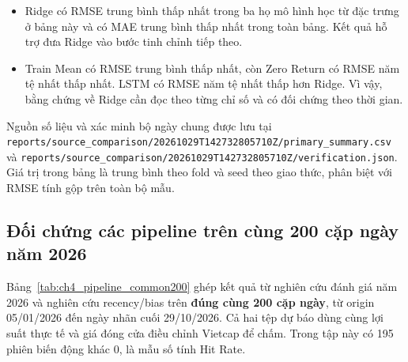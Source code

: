 \documentclass[12pt,a4paper]{report}
\begin{document}
\begin{itemize}
    \item Ridge có RMSE trung bình thấp nhất trong ba họ mô hình học từ đặc trưng ở bảng này và có MAE trung bình thấp nhất trong toàn bảng. Kết quả hỗ trợ đưa Ridge vào bước tinh chỉnh tiếp theo.
    \item Train Mean có RMSE trung bình thấp nhất, còn Zero Return có RMSE năm tệ nhất thấp nhất. LSTM có RMSE năm tệ nhất thấp hơn Ridge. Vì vậy, bằng chứng về Ridge cần đọc theo từng chỉ số và có đối chứng theo thời gian.
\end{itemize}

{\footnotesize Nguồn số liệu và xác minh bộ ngày chung được lưu tại \nolinkurl{reports/source_comparison/20261029T142732805710Z/primary_summary.csv} và \nolinkurl{reports/source_comparison/20261029T142732805710Z/verification.json}. Giá trị trong bảng là trung bình theo fold và seed theo giao thức, phân biệt với RMSE tính gộp trên toàn bộ mẫu.}

\subsection{Đối chứng các pipeline trên cùng 200 cặp ngày năm 2026}

Bảng~\ref{tab:ch4_pipeline_common200} ghép kết quả từ nghiên cứu đánh giá năm 2026 và nghiên cứu recency/bias trên \textbf{đúng cùng 200 cặp ngày}, từ origin 05/01/2026 đến ngày nhãn cuối 29/10/2026. Cả hai tệp dự báo dùng cùng lợi suất thực tế và giá đóng cửa điều chỉnh Vietcap để chấm. Trong tập này có 195 phiên biến động khác 0, là mẫu số tính Hit Rate.
\end{document}
